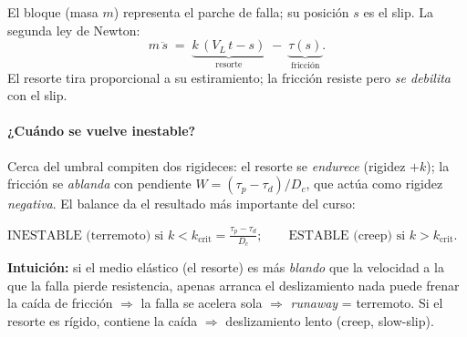 \documentclass[11pt,a4paper]{article}
\newcommand{\Dc}{D_c}
\newcommand{\taup}{\tau_p}
\newcommand{\taud}{\tau_d}
\begin{document}
\begin{center}
\end{center}

\noindent
El bloque (masa $m$) representa el parche de falla; su posición $s$ es el slip.
La segunda ley de Newton:
\begin{equation}
  m\,\ddot s \;=\; \underbrace{k\,(V_L\,t - s)}_{\text{resorte}}
                 \;-\; \underbrace{\tau(s)}_{\text{fricción}}.
  \label{eq:slider}
\end{equation}
El resorte tira proporcional a su estiramiento; la fricción resiste pero
\emph{se debilita} con el slip.

\paragraph{¿Cuándo se vuelve inestable?} Cerca del umbral compiten dos rigideces:
el resorte se \emph{endurece} (rigidez $+k$); la fricción se \emph{ablanda} con
pendiente $W=(\taup-\taud)/\Dc$, que actúa como rigidez \emph{negativa}. El
balance da el resultado más importante del curso:
\begin{keybox}
\centering
$\displaystyle
\text{INESTABLE (terremoto) si } k < k_{\mathrm{crit}}=\frac{\taup-\taud}{\Dc};
\qquad
\text{ESTABLE (creep) si } k>k_{\mathrm{crit}}.
$
\end{keybox}
\noindent
\textbf{Intuición:} si el medio elástico (el resorte) es más \emph{blando} que la
velocidad a la que la falla pierde resistencia, apenas arranca el deslizamiento
nada puede frenar la caída de fricción $\Rightarrow$ la falla se acelera sola
$\Rightarrow$ \emph{runaway} = terremoto. Si el resorte es rígido, contiene la
caída $\Rightarrow$ deslizamiento lento (creep, slow-slip).
\end{document}

